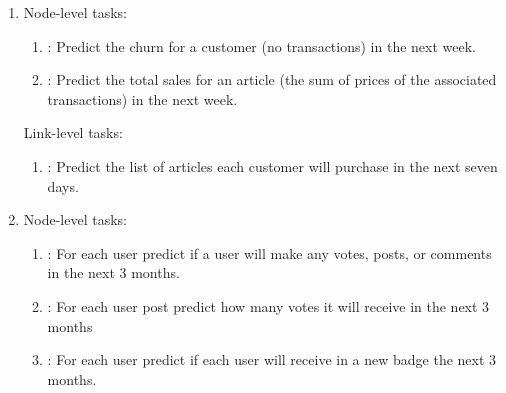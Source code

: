\begin{enumerate}
    Node-level tasks:
    \begin{enumerate}
    \item \driverPosition: Predict the average finishing position of each driver
    all races in the next 2 months.
    \item \driverDNF: For each driver predict the if they will DNF (did not finish) a race in the next 1 month.
    \item \driverTopThree: For each driver predict if they will qualify in the top-3 for a race in the next 1 month.
    \end{enumerate}


\item \handm

    Node-level tasks:
    \begin{enumerate}
    \item \userChurn: Predict the churn for a customer (no transactions) in the next week.
    \item \itemSales: Predict the total sales for an article (the sum of prices of the
    associated transactions) in the next week.
    \end{enumerate}

    Link-level tasks:
    \begin{enumerate}
    \item \userItemPurchase: Predict the list of articles each customer will purchase in the next
    seven days.
    \end{enumerate}

\item \stackex

    Node-level tasks:
    \begin{enumerate}
    \item \userEngage: For each user predict if a user will make any votes, posts, or comments in the next 3 months.
    \item \postVotes: For each user post predict how many votes it will receive in the next 3 months
    \item \userBadge: For each user predict if each user will receive in a new badge the next 3 months.
    \end{enumerate}


\end{enumerate}
